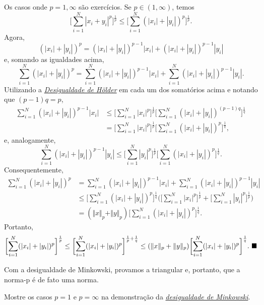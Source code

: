 \documentclass[../functional_analysis.tex]{subfiles}
\begin{document}
\begin{proof*}
	Os casos onde \(p=1, \infty\) são exercícios. Se \(p\in (1, \infty)\), temos
	\[
		\biggl[\sum\limits_{i=1}^{N}|x_{i}+y_{i}|^{p}\biggr]^{\frac{1}{p}} \leq \biggl[\sum\limits_{i=1}^{N}(|x_{i}|+|y_{i}|)^{p}\biggr]^{\frac{1}{p}}.
	\]
	Agora,
	\[
		(|x_{i}|+|y_{i}|)^{p} = (|x_{i}|+|y_{i}|)^{p-1}|x_{i}| + (|x_{i}|+|y_{i}|)^{p-1}|y_{i}|
	\]
	e, somando as igualdades acima,
	\[
		\sum\limits_{i=1}^{N}(|x_{i}|+|y_{i}|)^{p} = \sum\limits_{i=1}^{N}(|x_{i}|+|y_{i}|)^{p-1}|x_{i}| + \sum\limits_{i=1}^{N}(|x_{i}|+|y_{i}|)^{p-1}|y_{i}|.
	\]
	Utilizando a \hyperlink{holder_inequality}{\textit{Desigualdade de Hölder}} em cada um dos somatórios acima e notando que \((p-1)q = p\),
	\begin{align*}
		\sum\limits_{i=1}^{N}(|x_{i}|+|y_{i}|)^{p-1}|x_{i}| & \leq \biggl[\sum\limits_{i=1}^{N}|x_{i}|^{p}\biggr]^{\frac{1}{p}}\biggl[\sum\limits_{i=1}^{N}(|x_{i}|+|y_{i}|)^{(p-1)q}\biggr]^{\frac{1}{q}} \\
		                                                    & = \biggl[\sum\limits_{i=1}^{N}|x_{i}|^{p}\biggr]^{\frac{1}{p}}\biggl[\sum\limits_{i=1}^{N}(|x_{i}|+|y_{i}|)^{p}\biggr]^{\frac{1}{q}},
	\end{align*}
	e, analogamente,
	\[
		\sum\limits_{i=1}^{N}(|x_{i}|+|y_{i}|)^{p-1}|y_{i}| \leq \biggl[\sum\limits_{i=1}^{N}|y_{i}|^{p}\biggr]^{\frac{1}{p}}\biggl[\sum\limits_{i=1}^{N}(|x_{i}|+|y_{i}|)^{p}\biggr]^{\frac{1}{q}}.
	\]
	Consequentemente,
	\begin{align*}
		\sum\limits_{i=1}^{N}(|x_{i}|+|y_{i}|)^{p} & = \sum\limits_{i=1}^{N}(|x_{i}|+|y_{i}|)^{p-1}|x_{i}| + \sum\limits_{i=1}^{N}(|x_{i}|+|y_{i}|)^{p-1}|y_{i}|                                                                                                          \\
		                                           & \leq \biggl[\sum\limits_{i=1}^{N}(|x_{i}|+|y_{i}|)^{p}\biggr]^{\frac{1}{q}}\biggl(\biggl[\sum\limits_{i=1}^{N}|x_{i}|^{p}\biggr]^{\frac{1}{p}} + \biggl[\sum\limits_{i=1}^{N}|y_{i}|^{p}\biggr]^{\frac{1}{p}}\biggr) \\
		                                           & = (\Vert x \Vert_p + \Vert y \Vert_p)\biggl[\sum\limits_{i=1}^{N}(|x_{i}|+|y_{i}|)^{p}\biggr]^{\frac{1}{q}}.
	\end{align*}
	Portanto,
	\[
		\biggl[\sum\limits_{i=1}^{N}(|x_{i}|+|y_{i}|)^{p}\biggr]^{\frac{1}{p}} \leq \biggl[\sum\limits_{i=1}^{N}(|x_{i}|+|y_{i}|)^{p}\biggr]^{\frac{1}{p} + \frac{1}{q}} \leq (\Vert x \Vert_p + \Vert y \Vert_p)\biggl[\sum\limits_{i=1}^{N}(|x_{i}|+|y_{i}|)^{p}\biggr]^{\frac{1}{q}}. \text{ $\blacksquare$}
	\]
\end{proof*}
Com a desigualdade de Minkowski, provamos a triangular e, portanto, que a norma-p é de fato uma norma.
\begin{exr}
	Mostre os casos \(p=1\) e \( p=\infty\) na demonstração da \hyperlink{minkowski_inequality}{\textit{desigualdade de Minkowski}}.
\end{exr}
\end{document}
